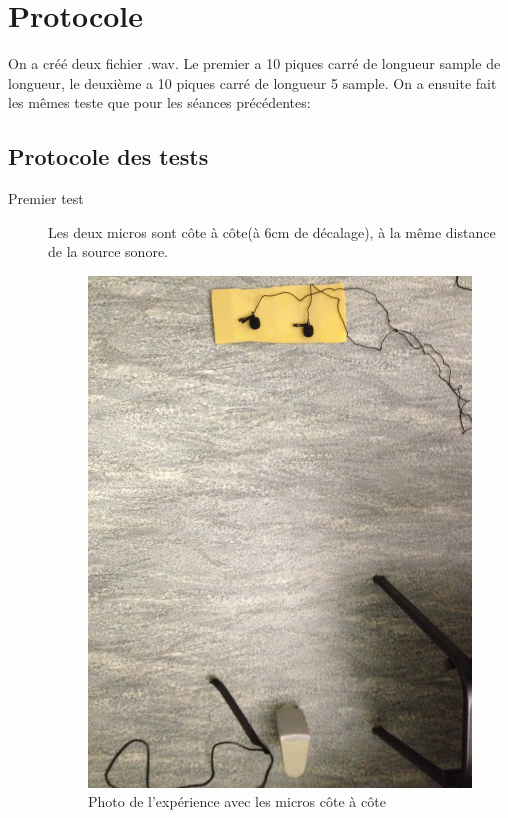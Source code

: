 \documentclass[12pt,a4paper]{article}
\begin{document}
\section{Protocole}
	On a créé deux fichier .wav. Le premier a 10 piques carré de longueur sample de longueur, le deuxième a 10 piques carré de longueur 5 sample.
	On a ensuite fait les mêmes teste que pour les séances précédentes:

\subsection{Protocole des tests}
\begin{description}
\item[Premier test] Les deux micros sont côte à côte(à 6cm de décalage), à la même distance de la source sonore.
	\begin{figure}[H]
	\includegraphics[width=\textwidth]{../donnees11-03/test_1.jpg} 
	\caption{Photo de l'expérience avec les micros côte à côte}

\end{figure}
\end{description}
\end{document}
